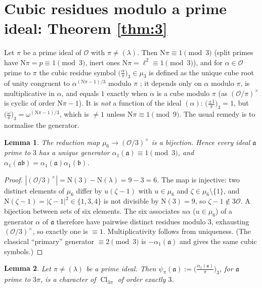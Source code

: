 \documentclass[11pt]{article}
\newtheorem{lemma}{Lemma}[section]
\theoremstyle{definition}
\theoremstyle{remark}
\numberwithin{equation}{section}
\newcommand{\cO}{\mathcal O}
\newcommand{\fa}{\mathfrak a}
\newcommand{\fb}{\mathfrak b}
\newcommand{\Nm}{\mathrm N}
\newcommand{\Cl}{\operatorname{Cl}}
\newcommand{\cubic}[2]{\bigl(\tfrac{#1}{#2}\bigr)_{3}}
\begin{document}
\section{Cubic residues modulo a prime ideal: Theorem \texorpdfstring{\ref{thm:3}}{3}}\label{sec:cubic}

Let $\pi$ be a prime ideal of $\cO$ with $\pi\ne(\lambda)$. Then $\Nm\pi\equiv1\pmod3$ (split primes have $\Nm\pi=p\equiv1\pmod3$, inert ones $\Nm\pi=\ell^2\equiv1\pmod3$), and for $\alpha\in\cO$ prime to $\pi$ the cubic residue symbol $\cubic{\alpha}{\pi}\in\mu_3$ is defined as the unique cube root of unity congruent to $\alpha^{(\Nm\pi-1)/3}$ modulo $\pi$ \cite[Chapter~9]{irelandrosen1990}; it depends only on $\alpha$ modulo $\pi$, is multiplicative in $\alpha$, and equals $1$ exactly when $\alpha$ is a cube modulo $\pi$ (as $(\cO/\pi)^\times$ is cyclic of order $\Nm\pi-1$). It is \emph{not} a function of the ideal $(\alpha)$: $\cubic{\pm1}{\pi}=1$, but $\cubic{\omega}{\pi}=\omega^{(\Nm\pi-1)/3}$, which is $\ne1$ unless $\Nm\pi\equiv1\pmod9$. The usual remedy is to normalise the generator.

\begin{lemma}\label{lem:oneprimary}
The reduction map $\mu_6\to(\cO/3)^\times$ is a bijection. Hence every ideal $\fa$ prime to $3$ has a unique generator $\alpha_1(\fa)\equiv1\pmod3$, and $\alpha_1(\fa\fb)=\alpha_1(\fa)\alpha_1(\fb)$.
\end{lemma}

\begin{proof}
$|(\cO/3)^\times|=\Nm(3)-\Nm(\lambda)=9-3=6$. The map is injective: two distinct elements of $\mu_6$ differ by $u(\zeta-1)$ with $u\in\mu_6$ and $\zeta\in\mu_6\setminus\{1\}$, and $\Nm(\zeta-1)=|\zeta-1|^2\in\{1,3,4\}$ is not divisible by $\Nm(3)=9$, so $\zeta-1\notin3\cO$. A bijection between sets of six elements. The six associates $u\alpha$ ($u\in\mu_6$) of a generator $\alpha$ of $\fa$ therefore have pairwise distinct residues modulo $3$, exhausting $(\cO/3)^\times$, so exactly one is $\equiv1$. Multiplicativity follows from uniqueness. (The classical ``primary'' generator $\equiv2\pmod3$ is $-\alpha_1(\fa)$ and gives the same cubic symbols.)
\end{proof}

\begin{lemma}\label{lem:psi}
Let $\pi\ne(\lambda)$ be a prime ideal. Then $\psi_\pi(\fa):=\cubic{\alpha_1(\fa)}{\pi}$, for $\fa$ prime to $3\pi$, is a character of $\Cl_{3\pi}$ of order exactly $3$.
\end{lemma}
\end{document}
